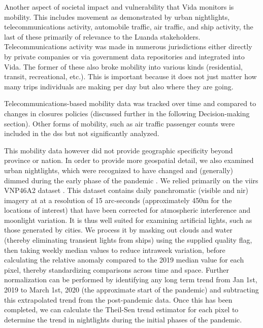 Another aspect of societal impact and vulnerability that Vida monitors is mobility. This includes movement as demonstrated by urban nightlights, telecommunications activity, automobile traffic, air traffic, and ship activity, the last of these primarily of relevance to the Luanda stakeholders. Telecommunications activity was made in numerous jurisdictions either directly by private companies \cite{googleCOVID19CommunityMobility} or via government data repositories \cite{ministeriodecienciatecnologiaconocimientoeinnovacionDatosCOVID192021} and integrated into Vida. The former of these also broke mobility into various kinds (residential, transit, recreational, etc.). This is important because it does not just matter how many trips individuals are making per day but also where they are going.

Telecommunications-based mobility data was tracked over time and compared to changes in closures policies (discussed further in the following Decision-making section). Other forms of mobility, such as air traffic passenger counts were included in the \ac{dss} but not significantly analyzed.

This mobility data however did not provide geographic specificity beyond province or nation. In order to provide more geospatial detail, we also examined urban nightlights, which were recognized to have changed and (generally) dimmed during the early phase of the pandemic \cite{elvidgeDimmingLightsChina2020}. We relied primarily on the \ac{viirs} VNP46A2 dataset \cite{romanNASABlackMarble2018}. This dataset contains daily panchromatic (visible and \ac{nir}) imagery at at a resolution of 15 arc-seconds (approximately 450m for the locations of interest) that have been corrected for atmospheric interference and moonlight variation. It is thus well suited for examining artificial lights, such as those generated by cities. We process it by masking out clouds and water (thereby eliminating transient lights from ships) using the supplied quality flag, then taking weekly median values to reduce intraweek variation, before calculating the relative anomaly compared to the 2019 median value for each pixel, thereby standardizing comparisons across time and space. Further normalization can be performed by identifying any long term trend from Jan 1st, 2019 to March 1st, 2020 (the approximate start of the pandemic) and subtracting this extrapolated trend from the post-pandemic data. Once this has been completed, we can calculate the Theil-Sen trend estimator for each pixel to determine the trend in nightlights during the initial phases of the pandemic.

